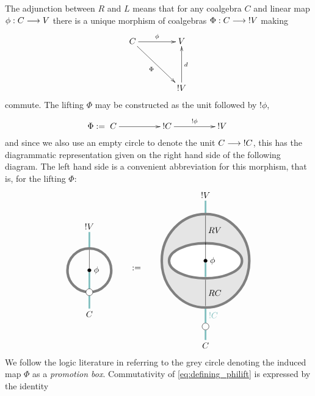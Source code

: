 \documentclass[english,letter paper,12pt,reqno]{article}
\def\drawbang{\draw[color=teal!50, line width=2pt]}
\def\drawprom{\draw[color=gray, line width=3pt]}
\def\mapnode{\node[circle,draw=black,fill=black,inner sep=0.5mm]}
\def\dernode{\node[circle,draw=black,fill=white]}
\theoremstyle{example}
\numberwithin{equation}{section}
\begin{document}
The adjunction between $R$ and $L$ means that for any coalgebra $C$ and linear map $\phi: C \longrightarrow V$ there is a unique morphism of coalgebras $\Phi : C \longrightarrow {!}V$ making
\begin{equation}\label{eq:defining_philift}
\xymatrix@C+1.5pc@R+1.5pc{
C \ar[r]^-{\phi}\ar[dr]_-{\Phi} & V\\
& {!}V \ar[u]_-{d}
}
\end{equation}
commute. The lifting $\Phi$ may be constructed as the unit followed by ${!} \phi$,
\[
\Phi := \xymatrix@C+2pc{ C \ar[r] & {!} C \ar[r]^-{{!} \phi} & {!} V}
\]
and since we also use an empty circle to denote the unit $C \longrightarrow {!} C$, this has the diagrammatic representation given on the right hand side of the following diagram. The left hand side is a convenient abbreviation for this morphism, that is, for the lifting $\Phi$:
\begin{equation}\label{eq:abbrev_for_prom}
\begin{tikzpicture}[scale=0.6,auto,inner sep=1mm, baseline=(current  bounding  box.center)]
\node (top) at (0,3) {$!V$};
\node (bottom) at (0,-3) {$C$};
\mapnode (o) at (0,0) {};
\node [right] at (o.east) {$\phi$};
\draw (o) to (0,2);
\drawbang (bottom) -- (0,-1.5);
\drawbang (0,1.5) -- (top);
\drawbang (0,-1.5) -- (o);
\drawprom (0,0) ellipse (1.5cm and 1.5cm);
\dernode (bottom) at (0,-1.5) {};
\end{tikzpicture}
\qquad := \qquad
\begin{tikzpicture}[scale=0.6,auto,inner sep=1mm,baseline=(current  bounding  box.center)]
\node (vtop) at (0,4.5) {${!} V$};
\node (bottom) at (0,-5.8) {$C$};
\coordinate (top_c) at (0,3);
\coordinate (bottom_c) at (0,-3.2);
\drawbang (top_c) to (vtop);
\dernode (bottomd) at (0,-4.5) {};
\drawbang (bottomd) to node [swap] {${!} C$} (bottom_c);
\drawbang (bottom) to (bottomd);
\draw[color=gray, line width=3pt, fill=gray!20] (0,0) ellipse (3cm and 3.2cm);
\draw[color=gray, line width=3pt, fill=white] (0,0) ellipse (2.5cm and 1.2cm);
\mapnode (o) at (0,0) {};
\node [right] at (o.east) {$\phi$};
\draw (o) to (0,1.2);
\drawbang (o) to (0,-1.1);
\draw (0,1.1) to node [swap] {$RV$} (0,3.1);
\draw (0,-3.1) to node [swap] {$RC$} (0,-1.3);
\end{tikzpicture}
\end{equation}
We follow the logic literature in referring to the grey circle denoting the induced map $\Phi$ as a \emph{promotion box}. Commutativity of \eqref{eq:defining_philift} is expressed by the identity
\end{document}
